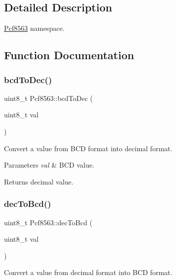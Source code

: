 \subsection{Detailed Description}
\hyperlink{namespacePcf8563}{Pcf8563} namespace. 

\subsection{Function Documentation}
\mbox{\label{namespacePcf8563_aae506e83df33a718bdd0dd184d42c19a}} 
\subsubsection{\texorpdfstring{bcd\+To\+Dec()}{bcdToDec()}}
{\footnotesize\ttfamily uint8\+\_\+t Pcf8563\+::bcd\+To\+Dec (\begin{DoxyParamCaption}\item[{uint8\+\_\+t}]{val }\end{DoxyParamCaption})}



Convert a value from B\+CD format into decimal format. 


\begin{DoxyParams}{Parameters}
{\em val} & B\+CD value. \\
\hline
\end{DoxyParams}
\begin{DoxyReturn}{Returns}
decimal value. 
\end{DoxyReturn}
\mbox{\label{namespacePcf8563_a3519616ff3c2de84e2ea54442ef0ed0c}} 
\subsubsection{\texorpdfstring{dec\+To\+Bcd()}{decToBcd()}}
{\footnotesize\ttfamily uint8\+\_\+t Pcf8563\+::dec\+To\+Bcd (\begin{DoxyParamCaption}\item[{uint8\+\_\+t}]{val }\end{DoxyParamCaption})}



Convert a value from decimal format into B\+CD format. 


